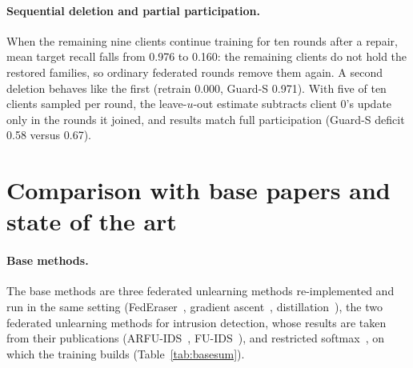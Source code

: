 \documentclass[pdflatex,sn-mathphys-num,iicol]{sn-jnl}
\begin{document}
\paragraph{Sequential deletion and partial participation.} When the remaining nine clients continue training for ten rounds after a repair, mean target recall falls from 0.976 to 0.160: the remaining clients do not hold the restored families, so ordinary federated rounds remove them again. A second deletion behaves like the first (retrain 0.000, Guard-S 0.971). With five of ten clients sampled per round, the leave-$u$-out estimate subtracts client 0's update only in the rounds it joined, and results match full participation (Guard-S deficit 0.58 versus 0.67).

\section{Comparison with base papers and state of the art}\label{sec:base}

\paragraph{Base methods.} The base methods are three federated unlearning methods re-implemented and run in the same setting (FedEraser~\cite{liu2021federaser}, gradient ascent~\cite{halimi2022}, distillation~\cite{wu2022distill}), the two federated unlearning methods for intrusion detection, whose results are taken from their publications (ARFU-IDS~\cite{yang2026arfu}, FU-IDS~\cite{wang2026fuids}), and restricted softmax~\cite{li2021fedrs}, on which the training builds (Table~\ref{tab:basesum}).
\end{document}
